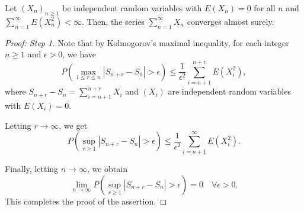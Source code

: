 \begin{theorem}
Let $(X_n)_{n\geq 1}$ be independent random variables with $E(X_n) = 0$ for all $n$ and $\sum_{n=1}^\infty E(X_n^2) < \infty$. Then, the series $\sum_{n=1}^\infty X_n$ converges almost surely.
\end{theorem}


\begin{proof}[Proof: Step 1]
Note that by Kolmogorov's maximal inequality, for each integer $n \geq 1$ and $\epsilon > 0$, we have
\[
P\left(\max_{1 \leq r \leq n} |S_{n+r} - S_n| > \epsilon\right) \leq \frac{1}{\epsilon^2} \sum_{i=n+1}^{n+r} E(X_i^2),
\]
where $S_{n+r} - S_n = \sum_{i=n+1}^{n+r} X_i$ and $(X_i)$ are independent random variables with $E(X_i) = 0$.

Letting $r \to \infty$, we get
\[
P\left(\sup_{r \geq 1} |S_{n+r} - S_n| > \epsilon\right) \leq \frac{1}{\epsilon^2} \sum_{i=n+1}^\infty E(X_i^2).
\]

Finally, letting $n \to \infty$, we obtain
\[
\lim_{n \to \infty} P\left(\sup_{r \geq 1} |S_{n+r} - S_n| > \epsilon\right) = 0 \quad \forall \epsilon > 0.
\]
This completes the proof of the assertion.
\end{proof}
